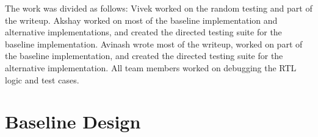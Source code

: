 \documentclass[10pt]{article}
\begin{document}
The work was divided as follows:
Vivek worked on the random testing and part of the writeup.
Akshay worked on most of the baseline implementation and alternative implementations, and created the directed testing suite for the baseline implementation.
Avinash wrote most of the writeup, worked on part of the baseline implementation, and created the directed testing suite for the alternative implementation.
All team members worked on debugging the RTL logic and test cases. \\





\section{Baseline Design}
\end{document}
